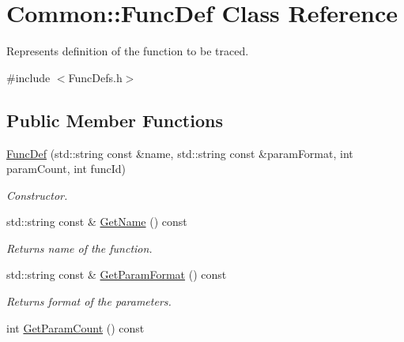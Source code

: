 \hypertarget{class_common_1_1_func_def}{\section{Common\-:\-:Func\-Def Class Reference}
\label{class_common_1_1_func_def}
}


Represents definition of the function to be traced.  




{\ttfamily \#include $<$Func\-Defs.\-h$>$}

\subsection*{Public Member Functions}
\begin{DoxyCompactItemize}
\item 
\hyperlink{class_common_1_1_func_def_a8a61bdb6eaf3f205d5ed8357d7a79e86}{Func\-Def} (std\-::string const \&name, std\-::string const \&param\-Format, int param\-Count, int func\-Id)
\begin{DoxyCompactList}\small\item\em Constructor. \end{DoxyCompactList}\item 
\hypertarget{class_common_1_1_func_def_a4a9f4c8c0ec7e96f4084c50b15e08f12}{std\-::string const \& \hyperlink{class_common_1_1_func_def_a4a9f4c8c0ec7e96f4084c50b15e08f12}{Get\-Name} () const }\label{class_common_1_1_func_def_a4a9f4c8c0ec7e96f4084c50b15e08f12}

\begin{DoxyCompactList}\small\item\em Returns name of the function. \end{DoxyCompactList}\item 
\hypertarget{class_common_1_1_func_def_a062193e6cd4c8d8618d1b55b3edc2198}{std\-::string const \& \hyperlink{class_common_1_1_func_def_a062193e6cd4c8d8618d1b55b3edc2198}{Get\-Param\-Format} () const }\label{class_common_1_1_func_def_a062193e6cd4c8d8618d1b55b3edc2198}

\begin{DoxyCompactList}\small\item\em Returns format of the parameters. \end{DoxyCompactList}\item 
\hypertarget{class_common_1_1_func_def_a92d64c6e41922738cd79c8c111c8ded9}{int \hyperlink{class_common_1_1_func_def_a92d64c6e41922738cd79c8c111c8ded9}{Get\-Param\-Count} () const }\label{class_common_1_1_func_def_a92d64c6e41922738cd79c8c111c8ded9}


\end{DoxyCompactItemize}

